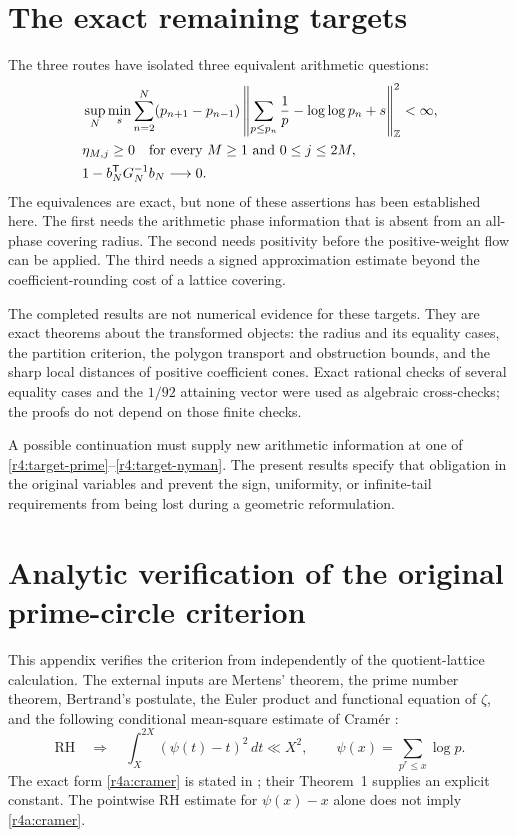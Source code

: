 \documentclass[11pt,a4paper]{article}
\theoremstyle{definition}\newtheorem{definition}[theorem]{Definition}
\theoremstyle{remark}\newtheorem{remark}[theorem]{Remark}
\numberwithin{equation}{section}
\begin{document}
\section{The exact remaining targets}
\label{r4:targets}

The three routes have isolated three equivalent arithmetic questions:
\begin{align}
 &\sup_N\min_s\sum_{n=2}^N(p_{n+1}-p_{n-1})
   \left\|\sum_{p\le p_n}\frac1p-\log\log p_n+s\right\|_{\mathbb Z}^{2}
   <\infty,\label{r4:target-prime}\\
 &\eta_{M,j}\ge0\quad\hbox{for every }M\ge1\hbox{ and }0\le j\le2M,
      \label{r4:target-poly}\\
 &1-b_N^{\mathsf T}G_N^{-1}b_N\longrightarrow0.
      \label{r4:target-nyman}
\end{align}
The equivalences are exact, but none of these assertions has been
established here. The first needs the arithmetic phase information
that is absent from an all-phase covering radius. The second needs
positivity before the positive-weight flow can be applied. The third
needs a signed approximation estimate beyond the coefficient-rounding
cost of a lattice covering.

The completed results are not numerical evidence for these targets.
They are exact theorems about the transformed objects: the radius and
its equality cases, the partition criterion, the polygon transport
and obstruction bounds, and the sharp local distances of positive
coefficient cones. Exact rational checks of several equality cases
and the $1/92$ attaining vector were used as algebraic cross-checks;
the proofs do not depend on those finite checks.

A possible continuation must supply new arithmetic information at one
of \eqref{r4:target-prime}--\eqref{r4:target-nyman}. The present results
specify that obligation in the original variables and prevent the sign,
uniformity, or infinite-tail requirements from being lost during a
geometric reformulation.


\appendix

\section{Analytic verification of the original prime-circle criterion}
\label{r4a:appendix}

This appendix verifies the criterion from \cite{PrimeCircles}
independently of the quotient-lattice calculation.  The external
inputs are Mertens' theorem, the prime number theorem, Bertrand's
postulate, the Euler product and functional equation of $\zeta$, and
the following conditional mean-square estimate of Cram\'er
\cite{Cramer}:
\begin{equation}\label{r4a:cramer}
 \mathrm{RH}\quad\Longrightarrow\quad
 \int_X^{2X}(\psi(t)-t)^2\,dt\ll X^2,
 \qquad
 \psi(x)=\sum_{p^r\leq x}\log p.
\end{equation}
The exact form \eqref{r4a:cramer} is stated in
\cite[eq.~(1)]{BrentPlattTrudgian}; their Theorem~1 supplies an
explicit constant.  The pointwise RH estimate for $\psi(x)-x$
alone does not imply \eqref{r4a:cramer}.
\end{document}
